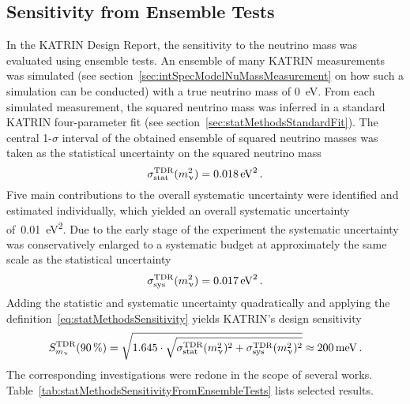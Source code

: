 \subsection{Sensitivity from Ensemble Tests}
\label{sec:statMethodsSensitivtyFromEnsemble}
In the KATRIN Design Report, the sensitivity to the neutrino mass was evaluated using ensemble tests. An ensemble of many KATRIN measurements was simulated (see section~\ref{sec:intSpecModelNuMassMeasurement} on how such a simulation can be conducted) with a true neutrino mass of \SI{0}{eV}. From each simulated measurement, the squared neutrino mass was inferred in a standard KATRIN four-parameter fit (see section~\ref{sec:statMethodsStandardFit}). The central 1-$\sigma$ interval of the obtained ensemble of squared neutrino masses was taken as the statistical uncertainty on the squared neutrino mass~\cite{Angrik:2005ep}
\begin{equation}
	\sigma_\mathrm{stat}^\mathrm{TDR}(m_\upnu^2) = \SI{0.018}{eV^2}
	\text{\,.}
\end{equation}
Five main contributions to the overall systematic uncertainty were identified and estimated individually, which yielded an overall systematic uncertainty of~\SI{0.01}{eV^2}. Due to the early stage of the experiment the systematic uncertainty was conservatively enlarged to a systematic budget at approximately the same scale as the statistical uncertainty~\cite{Angrik:2005ep}
\begin{equation}
	\label{eq:statMethodsSensitivtyFromEnsembleTDRSysBudget}
	\sigma_\mathrm{sys}^\mathrm{TDR}(m_\upnu^2) = \SI{0.017}{eV^2}
	\text{\,.}
\end{equation}
Adding the statistic and systematic uncertainty quadratically and applying the definition~\eqref{eq:statMethodsSensitivity} yields KATRIN's design sensitivity~\cite{Angrik:2005ep}
\begin{equation}
	\label{eq:statMethodsSensitivityDesignReport}
	S_{m_\upnu}^{\mathrm{TDR}}(\SI{90}{\percent}) = 
	\sqrt{1.645\cdot
		\sqrt{
		\sigma_\mathrm{stat}^\mathrm{TDR}(m_\upnu^2)^2+\sigma_\mathrm{sys}^\mathrm{TDR}(m_\upnu^2)^2
	}}
	\approx \SI{200}{meV}
	\text{\,.}
\end{equation}
The corresponding investigations were redone in the scope of several works. Table~\ref{tab:statMethodsSensitivityFromEnsembleTests} lists selected results.
